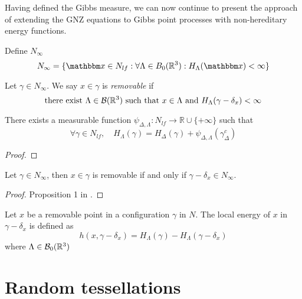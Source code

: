 Having defined the Gibbs measure, we can now continue to present the approach of \cite{DereudreLavancier2007} extending the GNZ equations to Gibbs point processes with non-hereditary energy functions.

Define $N_\infty$
$$N_\infty = \{\x \in N_{lf}: \forall \Lambda \in B_0(\Rt): H_\Lambda(\x)< \infty\}$$

\begin{definition}
	Let $\gamma \in N_\infty$. We say $x\in\gamma$ is \textit{removable} if 
	$$\text{there exist } \Lambda \in \mathcal B({\mathbb R^3}) \text{ such that } x\in\Lambda \text{ and } H_\Lambda(\gamma - \delta_x)<\infty$$
\end{definition}


\begin{lemma}
	There exists a measurable function $\psi_{\Delta,\Lambda}:N_{lf}\to \mathbb R\cup\{+\infty\}$ such that
	$$\forall \gamma \in N_{lf},\quad H_\Lambda(\gamma) = H_\Delta(\gamma) + \psi_{\Delta,\Lambda}(\gamma_\Delta^c)$$
\end{lemma}
\begin{proof}
	
\end{proof}


\begin{proposition}
	Let $\gamma \in N_\infty$, then $x\in\gamma$ is removable if and only if $\gamma - \delta_x \in N_\infty$.
\end{proposition}
\begin{proof}
	Proposition 1 in \cite{DereudreLavancier2007}.	
\end{proof}


\begin{definition}
	Let $x$ be a removable point in a configuration $\gamma$ in $N$. The local energy of $x$ in $\gamma - \delta_x$ is defined as
	$$h(x,\gamma - \delta_x) = H_\Lambda (\gamma) - H_\Lambda(\gamma - \delta_x)$$
	where $\Lambda \in \mathcal B_0({\mathbb R^3})$
\end{definition}
\begin{proposition}

\end{proposition}






\section{Random tessellations}
